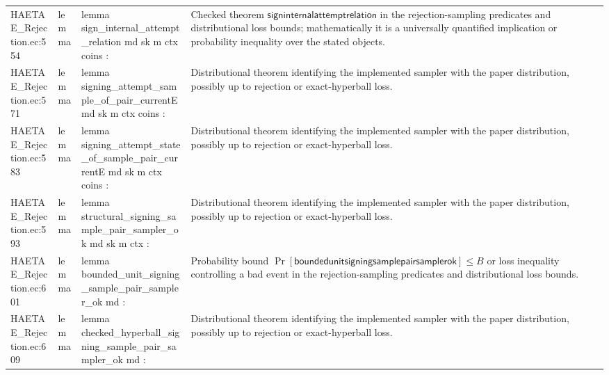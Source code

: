 \documentclass[10pt]{article}
\begin{document}
\begin{longtable}{L{0.11\textwidth}L{0.055\textwidth}L{0.385\textwidth}L{0.41\textwidth}}
HAETAE\_\allowbreak{}Rejection.\allowbreak{}ec:\allowbreak{}554 & lemma & {\ttfamily\scriptsize lemma sign\_\allowbreak{}internal\_\allowbreak{}attempt\_\allowbreak{}relation md sk m ctx coins :} & Checked theorem $\mathsf{signinternalattemptrelation}$ in the rejection-sampling predicates and distributional loss bounds; mathematically it is a universally quantified implication or probability inequality over the stated objects. \\
HAETAE\_\allowbreak{}Rejection.\allowbreak{}ec:\allowbreak{}571 & lemma & {\ttfamily\scriptsize lemma signing\_\allowbreak{}attempt\_\allowbreak{}sample\_\allowbreak{}of\_\allowbreak{}pair\_\allowbreak{}currentE md sk m ctx coins :} & Distributional theorem identifying the implemented sampler with the paper distribution, possibly up to rejection or exact-hyperball loss. \\
HAETAE\_\allowbreak{}Rejection.\allowbreak{}ec:\allowbreak{}583 & lemma & {\ttfamily\scriptsize lemma signing\_\allowbreak{}attempt\_\allowbreak{}state\_\allowbreak{}of\_\allowbreak{}sample\_\allowbreak{}pair\_\allowbreak{}currentE md sk m ctx coins :} & Distributional theorem identifying the implemented sampler with the paper distribution, possibly up to rejection or exact-hyperball loss. \\
HAETAE\_\allowbreak{}Rejection.\allowbreak{}ec:\allowbreak{}593 & lemma & {\ttfamily\scriptsize lemma structural\_\allowbreak{}signing\_\allowbreak{}sample\_\allowbreak{}pair\_\allowbreak{}sampler\_\allowbreak{}ok md sk m ctx :} & Distributional theorem identifying the implemented sampler with the paper distribution, possibly up to rejection or exact-hyperball loss. \\
HAETAE\_\allowbreak{}Rejection.\allowbreak{}ec:\allowbreak{}601 & lemma & {\ttfamily\scriptsize lemma bounded\_\allowbreak{}unit\_\allowbreak{}signing\_\allowbreak{}sample\_\allowbreak{}pair\_\allowbreak{}sampler\_\allowbreak{}ok md :} & Probability bound $\Pr[\mathsf{boundedunitsigningsamplepairsamplerok}]\le B$ or loss inequality controlling a bad event in the rejection-sampling predicates and distributional loss bounds. \\
HAETAE\_\allowbreak{}Rejection.\allowbreak{}ec:\allowbreak{}609 & lemma & {\ttfamily\scriptsize lemma checked\_\allowbreak{}hyperball\_\allowbreak{}signing\_\allowbreak{}sample\_\allowbreak{}pair\_\allowbreak{}sampler\_\allowbreak{}ok md :} & Distributional theorem identifying the implemented sampler with the paper distribution, possibly up to rejection or exact-hyperball loss. \\

\end{longtable}
\end{document}
